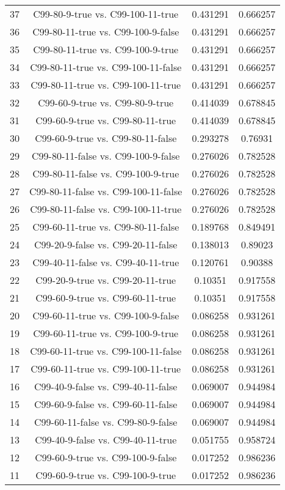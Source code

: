 \documentclass[a4paper,10pt]{article}
\begin{document}
\begin{landscape}
\begin{table}[!htp]
\begin{tabular}{cccc}
37&C99-80-9-true vs. C99-100-11-true&0.431291&0.666257\\
36&C99-80-11-true vs. C99-100-9-false&0.431291&0.666257\\
35&C99-80-11-true vs. C99-100-9-true&0.431291&0.666257\\
34&C99-80-11-true vs. C99-100-11-false&0.431291&0.666257\\
33&C99-80-11-true vs. C99-100-11-true&0.431291&0.666257\\
32&C99-60-9-true vs. C99-80-9-true&0.414039&0.678845\\
31&C99-60-9-true vs. C99-80-11-true&0.414039&0.678845\\
30&C99-60-9-true vs. C99-80-11-false&0.293278&0.76931\\
29&C99-80-11-false vs. C99-100-9-false&0.276026&0.782528\\
28&C99-80-11-false vs. C99-100-9-true&0.276026&0.782528\\
27&C99-80-11-false vs. C99-100-11-false&0.276026&0.782528\\
26&C99-80-11-false vs. C99-100-11-true&0.276026&0.782528\\
25&C99-60-11-true vs. C99-80-11-false&0.189768&0.849491\\
24&C99-20-9-false vs. C99-20-11-false&0.138013&0.89023\\
23&C99-40-11-false vs. C99-40-11-true&0.120761&0.90388\\
22&C99-20-9-true vs. C99-20-11-true&0.10351&0.917558\\
21&C99-60-9-true vs. C99-60-11-true&0.10351&0.917558\\
20&C99-60-11-true vs. C99-100-9-false&0.086258&0.931261\\
19&C99-60-11-true vs. C99-100-9-true&0.086258&0.931261\\
18&C99-60-11-true vs. C99-100-11-false&0.086258&0.931261\\
17&C99-60-11-true vs. C99-100-11-true&0.086258&0.931261\\
16&C99-40-9-false vs. C99-40-11-false&0.069007&0.944984\\
15&C99-60-9-false vs. C99-60-11-false&0.069007&0.944984\\
14&C99-60-11-false vs. C99-80-9-false&0.069007&0.944984\\
13&C99-40-9-false vs. C99-40-11-true&0.051755&0.958724\\
12&C99-60-9-true vs. C99-100-9-false&0.017252&0.986236\\
11&C99-60-9-true vs. C99-100-9-true&0.017252&0.986236\\

\end{tabular}
\end{table}
\end{landscape}
\end{document}
